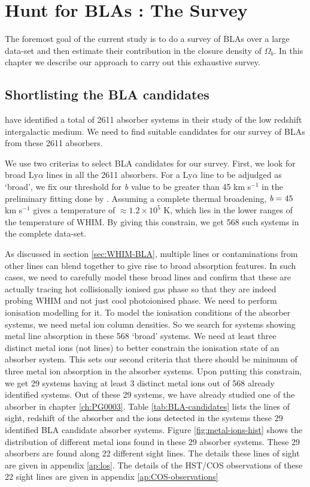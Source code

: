 \chapter{Hunt for BLAs : The Survey} \label{ch:Survey}

The foremost goal of the current study is to do a survey of BLAs over a large data-set and then estimate their contribution in the closure density of $\Omega_b$. In this chapter we describe our approach to carry out this exhaustive survey.

\section{Shortlisting the BLA candidates} \label{sec:BLA-candidates}

\citet{danforth-2016} have identified a total of 2611 absorber systems in their study of the low redshift intergalactic medium. We need to find suitable candidates for our survey of BLAs from these 2611 absorbers.

We use two criterias to select BLA candidates for our survey. First, we look for broad Ly$\alpha$ lines in all the 2611 absorbers. For a Ly$\alpha$ line to be adjudged as `broad', we fix our threshold for \emph{b} value to be greater than 45 km s$^{-1}$ in the preliminary fitting done by \citet{danforth-2016}. Assuming a complete thermal broadening, $\emph{b}=45$ km s$^{-1}$ gives a temperature of $\approx 1.2 \times 10^5$ K, which lies in the lower ranges of the temperature of WHIM. By giving this constrain, we get 568 such systems in the complete data-set.

As discussed in section \ref{sec:WHIM-BLA}, multiple lines or contaminations from other lines can blend together to give rise to broad absorption features. In such cases, we need to carefully model these broad lines and confirm that these are actually tracing hot collisionally ionised gas phase so that they are indeed probing WHIM and not just cool photoionised phase. We need to perform ionisation modelling for it. To model the ionisation conditions of the absorber systems, we need metal ion column densities. So we search for systems showing metal line absorption in these 568 `broad' systems. We need at least three distinct metal ions (not lines) to better constrain the ionisation state of an absorber system. This sets our second criteria that there should be minimum of three metal ion absorption in the absorber systems. Upon putting this constrain, we get 29 systems having at least 3 distinct metal ions out of 568 already identified systems. Out of these 29 systems, we have already studied one of the absorber in chapter \ref{ch:PG0003}. Table \ref{tab:BLA-candidates} lists the lines of sight, redshift of the absorber and the ions detected in the systems these 29 identified BLA candidate absorber systems. Figure \ref{fig:metal-ions-hist} shows the distribution of different metal ions found in these 29 absorber systems. These 29 absorbers are found along 22 different sight lines. The details these lines of sight are given in appendix \ref{ap:los}. The details of the HST/COS observations of these 22 sight lines are given in appendix \ref{ap:COS-observations}


